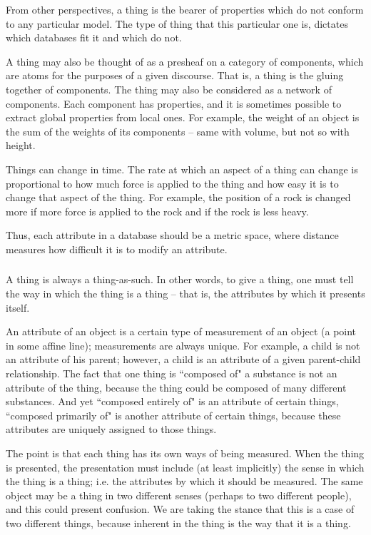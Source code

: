 \documentclass{amsart}
\begin{document}
From other perspectives, a thing is the bearer of properties which do not conform to any particular model.  The type of thing that this particular one is, dictates which databases fit it and which do not.

A thing may also be thought of as a presheaf on a category of components, which are atoms for the purposes of a given discourse.  That is, a thing is the gluing together of components.  The thing may also be considered as a network of components.  Each component has properties, and it is sometimes possible to extract global properties from local ones.  For example, the weight of an object is the sum of the weights of its components -- same with volume, but not so with height.

Things can change in time.  The rate at which an aspect of a thing can change is proportional to how much force is applied to the thing and how easy it is to change that aspect of the thing.  For example, the position of a rock is changed more if more force is applied to the rock and if the rock is less heavy.  

Thus, each attribute in a database should be a metric space, where distance measures how difficult it is to modify an attribute.    

\subsubsection{}

A thing is always a thing-as-such.  In other words, to give a thing, one must tell the way in which the thing is a thing -- that is, the attributes by which it presents itself.

An attribute of an object is a certain type of measurement of an object (a point in some affine line); measurements are always unique.  For example, a child is not an attribute of his parent; however, a child is an attribute of a given parent-child relationship.  The fact that one thing is ``composed of" a substance is not an attribute of the thing, because the thing could be composed of many different substances.  And yet ``composed entirely of" is an attribute of certain things, ``composed primarily of" is another attribute of certain things, because these attributes are uniquely assigned to those things.

The point is that each thing has its own ways of being measured.  When the thing is presented, the presentation must include (at least implicitly) the sense in which the thing is a thing; i.e. the attributes by which it should be measured.  The same object may be a thing in two different senses (perhaps to two different people), and this could present confusion.  We are taking the stance that this is a case of two different things, because inherent in the thing is the way that it is a thing.
\end{document}
